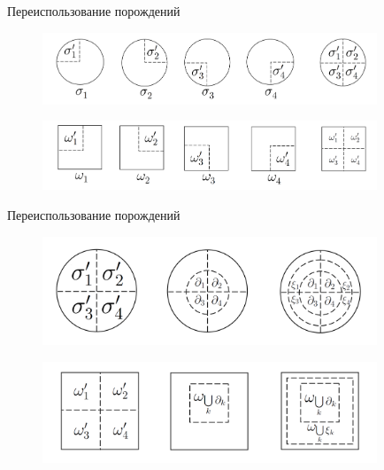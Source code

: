 \begin{frame}{Переиспользование порождений}
\begin{figure}[!h]
	\centering
	\includegraphics[width=100mm]{theorem2_src.png}
\end{figure}

\begin{figure}[!h]
	\centering
	\includegraphics[width=100mm]{theorem2_dst.png}
\end{figure}
\end{frame}

\begin{frame}{Переиспользование порождений}
\begin{figure}[!h]
	\centering
	\includegraphics[width=100mm]{theorem2_srcn.png}
\end{figure}

\begin{figure}[!h]
	\centering
	\includegraphics[width=100mm]{theorem2_dstn.png}
\end{figure}
\end{frame}

\newcommand{\sigi}{{\sigma_i}}
\newcommand{\sigk}{{\sigma_k}}
\newcommand{\sigpi}{{\sigma^\prime_i}}
\newcommand{\sigpj}{{\sigma^\prime_j}}
\newcommand{\sigpk}{{\sigma^\prime_k}}
\newcommand{\parti}{{\partial_i}}
\newcommand{\partj}{{\partial_j}}
\newcommand{\partk}{{\partial_k}}
\newcommand{\xii}{{\xi_i}}
\newcommand{\xij}{{\xi_j}}
\newcommand{\xik}{{\xi_k}}
\newcommand{\sms}{{\setminus}}
\newcommand{\alloth}{\bigcup\limits_{j \neq i}\omega^\prime_j}
\newcommand{\allothk}{\bigcup\limits_{j \neq k}\omega^\prime_j}
\newcommand{\allothD}{\bigcup\limits_{j \neq i}\omega^\Delta_{\sigpj}}
\newcommand{\rprt}{{\text{п.ч.}}}

